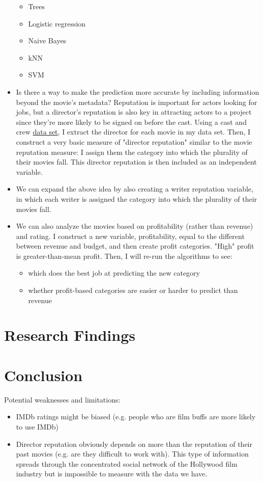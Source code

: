 \documentclass{article}
\begin{document}
\begin{itemize}
    \begin{itemize}
        \item Trees
        \item Logistic regression
        \item Naive Bayes
        \item kNN
        \item SVM
    \end{itemize}
    \item Is there a way to make the prediction more accurate by including information beyond the movie's metadata? Reputation is important for actors looking for jobs, but a director's reputation is also key in attracting actors to a project since they're more likely to be signed on before the cast\cite{elberse}. Using a cast and crew \href{https://www.kaggle.com/rounakbanik/the-movies-dataset#credits.csv}{data set}, I extract the director for each movie in my data set. Then, I construct a very basic measure of "director reputation" similar to the movie reputation measure: I assign them the category into which the plurality of their movies fall. This director reputation is then included as an independent variable.
    \item We can expand the above idea by also creating a writer reputation variable, in which each writer is assigned the category into which the plurality of their movies fall.
    \item We can also analyze the movies based on profitability (rather than revenue) and rating. I construct a new variable, profitability, equal to the different between revenue and budget, and then create profit categories. "High" profit is greater-than-mean profit. Then, I will re-run the algorithms to see:
    \begin{itemize}
        \item which does the best job at predicting the new category
        \item whether profit-based categories are easier or harder to predict than revenue
    \end{itemize}
\end{itemize}

\section{Research Findings}

\section{Conclusion}
Potential weaknesses and limitations:
\begin{itemize}
    \item IMDb ratings might be biased (e.g. people who are film buffs are more likely to use IMDb)
    \item Director reputation obviously depends on more than the reputation of their past movies (e.g. are they difficult to work with). This type of information spreads through the concentrated social network of the Hollywood film industry\cite{ebbers} but is impossible to measure with the data we have.
\end{itemize}




\end{document}
